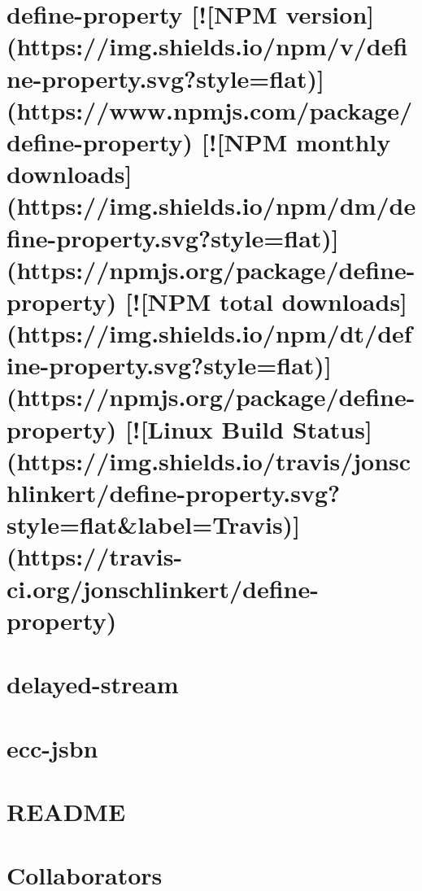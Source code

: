 \documentclass[twoside]{book}
\newcommand{\+}{\discretionary{\mbox{\scriptsize$\hookleftarrow$}}{}{}}
\begin{document}
\chapter{define-\/property \mbox{[}!\mbox{[}N\+PM version\mbox{]}(https\+://img.shields.\+io/npm/v/define-\/property.svg?style=flat)\mbox{]}(https\+://www.npmjs.\+com/package/define-\/property) \mbox{[}!\mbox{[}N\+PM monthly downloads\mbox{]}(https\+://img.shields.\+io/npm/dm/define-\/property.svg?style=flat)\mbox{]}(https\+://npmjs.org/package/define-\/property) \mbox{[}!\mbox{[}N\+PM total downloads\mbox{]}(https\+://img.shields.\+io/npm/dt/define-\/property.svg?style=flat)\mbox{]}(https\+://npmjs.org/package/define-\/property) \mbox{[}!\mbox{[}Linux Build Status\mbox{]}(https\+://img.shields.\+io/travis/jonschlinkert/define-\/property.svg?style=flat\&label=Travis)\mbox{]}(https\+://travis-\/ci.org/jonschlinkert/define-\/property)}
\label{md_dsmacc_vis_degree_node_modules_define-property_README}

\chapter{delayed-\/stream}
\label{md_dsmacc_vis_degree_node_modules_delayed-stream_Readme}

\chapter{ecc-\/jsbn}
\label{md_dsmacc_vis_degree_node_modules_ecc-jsbn_README}

\chapter{R\+E\+A\+D\+ME}
\label{md_dsmacc_vis_degree_node_modules_electron_README}

\chapter{Collaborators}
\label{md_dsmacc_vis_degree_node_modules_electron-download_collaborators}

\end{document}
